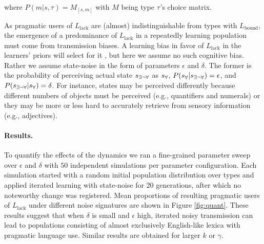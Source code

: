 \documentclass[10pt,a4paper]{article}
\newcommand{\state}{\ensuremath{s}\xspace}		%
\newcommand{\mystate}[1]{\ensuremath{\state_{\text{#1}}}\xspace} %
\newcommand{\ssome}{\mystate{\ensuremath{\exists\neg\forall}}}
\newcommand{\sall}{\mystate{\ensuremath{\forall}}}
\newcommand{\type}[1]{\ensuremath{\tau_{#1}}}
\newcommand{\postparameter}{\ensuremath{\gamma}}
\begin{document}
\noindent where $P(m|s,\type{}) = M_{[s,m]}$ with $M$ being type \type{}'s choice matrix.

As pragmatic users of $L_\text{lack}$ are (almost) indistinguishable from types with
$L_\text{bound}$, the emergence of a predominance of $L_\text{lack}$ in a repeatedly learning
population must come from transmission biases. A learning bias in favor of $L_\text{lack}$ in
the learners' priors will select for it \citep{brochhagen+etal:2016:CogSci}, but here we assume
no such cognitive bias. Rather we assume state-noise in the form of parameters $\epsilon$ and
$\delta$. The former is the probability of perceiving actual state $\ssome$ as
$\sall$, $P(\sall | \ssome) = \epsilon$, and $P(\ssome | \sall) = \delta$. For instance, states
may be perceived differently because different numbers of objects must be perceived (e.g.,
quantifiers and numerals) or they may be more or less hard to accurately retrieve from sensory
information (e.g., adjectives).


\paragraph{Results.} To quantify the effects of the dynamics we ran a fine-grained parameter
sweep over $\epsilon$ and $\delta$ with $50$ independent simulations per parameter
configuration. Each simulation started with a random initial population distribution over types
and applied iterated learning with state-noise for $20$ generations, after which no noteworthy change was registered.
Mean proportions of resulting pragmatic users of $L_{\text{lack}}$ under different noise signatures are shown in Figure
\ref{fig:quant}. These results suggest that when $\delta$ is small and $\epsilon$ high, iterated noisy transmission can
lead to populations consisting of almost exclusively English-like lexica with pragmatic
language use. Similar results are obtained for larger $k$ or \postparameter.
\end{document}
